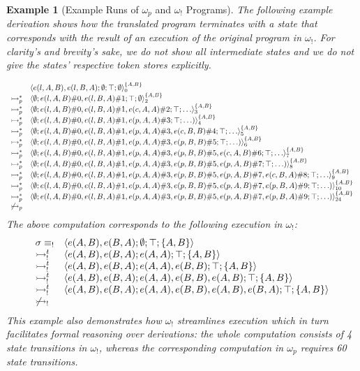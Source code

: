 \documentclass{tlp}
\newtheorem{example}{Example}[section]
\newcommand{\bang}{\ensuremath{!}}
\def\tuple#1{\langle #1 \rangle}
\newcommand{\stbang}[4]{\ensuremath{\tuple{#1; #2; #3; #4}}}
\newcommand{\tstate}[6]{\ensuremath{\tuple{#1; #2; #3; #4}_{#5}^{#6}}}
\newcommand{\obang}{\ensuremath{{\omega_\bang}}}
\newcommand{\ebang}{\ensuremath{\equiv_{\bang}}}
\newcommand{\der}{\ensuremath{\rightarrowtail}}
\newcommand{\derp}{\ensuremath{\der_p}}
\newcommand{\derbang}{\ensuremath{\der_{\bang}}}
\begin{document}
\begin{example}[Example Runs of $\omega_p$ and $\obang$ Programs] The following
example derivation shows how the translated program terminates with a state that
corresponds with the result of an execution of the original program in $\obang$.
For clarity's and brevity's sake, we do not show all intermediate states and we
do not give the states' respective token stores explicitly.

\tiny\[
\begin{array}{ll}
& 	\tstate{e(l,A,B),e(l,B,A)}{\emptyset}{\top}{\emptyset}{0}{\{A,B\}}\\
\derp^* &
	\tstate{\emptyset}{e(l,A,B)\#0,e(l,B,A)\#1}{\top}{\emptyset}{2}{\{A,B\}}\\
\derp^{*} &
	\tstate{\emptyset}{e(l,A,B)\#0,e(l,B,A)\#1,e(c,A,A)\#2}{\top}{\ldots}{3}{\{A,B\}}\\
\derp^{*} &
	\tstate{\emptyset}{e(l,A,B)\#0,e(l,B,A)\#1,e(p,A,A)\#3}{\top}{\ldots)}{4}{\{A,B\}}\\
\derp^{*} &
	\tstate{\emptyset}{e(l,A,B)\#0,e(l,B,A)\#1,e(p,A,A)\#3,e(c,B,B)\#4}{\top}{\ldots}{5}{\{A,B\}}\\
\derp^{*} &
	\tstate{\emptyset}{e(l,A,B)\#0,e(l,B,A)\#1,e(p,A,A)\#3,e(p,B,B)\#5}{\top}{\ldots)}{6}{\{A,B\}}\\
\derp^{*} &
	\tstate{\emptyset}{e(l,A,B)\#0,e(l,B,A)\#1,e(p,A,A)\#3,e(p,B,B)\#5,e(c,A,B)\#6}{\top}{\ldots}{7}{\{A,B\}}\\
\derp^{*} &
	\tstate{\emptyset}{e(l,A,B)\#0,e(l,B,A)\#1,e(p,A,A)\#3,e(p,B,B)\#5,e(p,A,B)\#7}{\top}{\ldots)}{8}{\{A,B\}}\\
\derp^{*} &
	\tstate{\emptyset}{e(l,A,B)\#0,e(l,B,A)\#1,e(p,A,A)\#3,e(p,B,B)\#5,e(p,A,B)\#7,e(c,B,A)\#8}{\top}{\ldots}{9}{\{A,B\}}\\
\derp^{*} &
	\tstate{\emptyset}{e(l,A,B)\#0,e(l,B,A)\#1,e(p,A,A)\#3,e(p,B,B)\#5,e(p,A,B)\#7,e(p,B,A)\#9}{\top}{\ldots)}{10}{\{A,B\}}\\
\derp^{*} &
	\tstate{\emptyset}{e(l,A,B)\#0,e(l,B,A)\#1,e(p,A,A)\#3,e(p,B,B)\#5,e(p,A,B)\#7,e(p,B,A)\#9}{\top}{\ldots)}{24}{\{A,B\}}\\
\not\derp
\end{array}
\]
\normalsize
The above computation corresponds to the following execution
in $\obang$:
\[
\begin{array}{ll}
\sigma \ebang & \stbang{e(A,B), e(B,A)}{\emptyset}{\top}{\{A,B\}}\\
\derbang^t & \stbang{e(A,B),e(B,A)}{e(A,A)}{\top}{\{A,B\}}\\
\derbang^t & \stbang{e(A,B),e(B,A)}{e(A,A),e(B,B)}{\top}{\{A,B\}}\\
\derbang^t & \stbang{e(A,B),e(B,A)}{e(A,A),e(B,B),e(A,B)}{\top}{\{A,B\}}\\
\derbang^t &
\stbang{e(A,B),e(B,A)}{e(A,A),e(B,B),e(A,B),e(B,A)}{\top}{\{A,B\}}\\
\not \derbang
\end{array}
\] 
This example also demonstrates how $\obang$ streamlines execution which in turn
facilitates formal reasoning over derivations: the whole computation consists of
4 state transitions in $\obang$, whereas the corresponding computation in
$\omega_p$ requires 60 state transitions.
\end{example}
\end{document}

